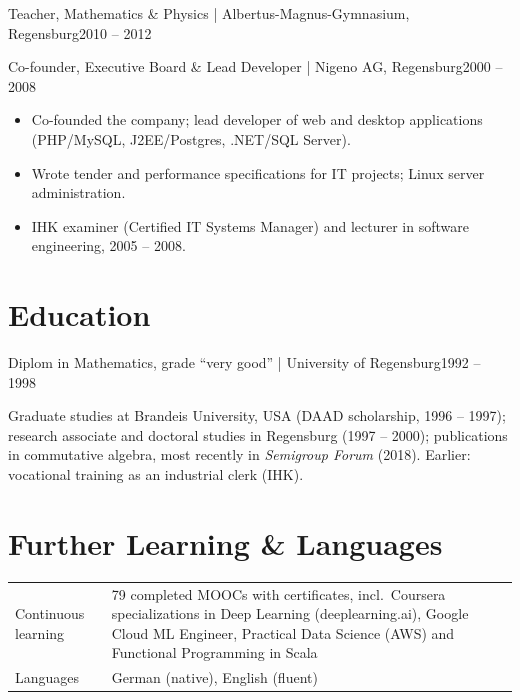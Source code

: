 \documentclass[10pt,a4paper]{article}
\newcommand*{\semibold}{\fontseries{sb}\selectfont}
\newcommand*{\job}[3]{%
  \par\addvspace{4pt}%
  {\semibold #1}\,{\color{muted}\,|\,\,#2}\hfill{\color{muted}\small #3}\par}
\newcommand*{\skill}[2]{{\semibold #1} & #2 \\[1.5pt]}
\begin{document}
\job{Teacher, Mathematics \& Physics}{Albertus-Magnus-Gymnasium, Regensburg}{2010 -- 2012}

\job{Co-founder, Executive Board \& Lead Developer}{Nigeno AG, Regensburg}{2000 -- 2008}
\begin{itemize}
  \item Co-founded the company; lead developer of web and desktop applications (PHP/MySQL, J2EE/Postgres, .NET/SQL Server).
  \item Wrote tender and performance specifications for IT projects; Linux server administration.
  \item IHK examiner (Certified IT Systems Manager) and lecturer in software engineering, 2005 -- 2008.
\end{itemize}

\section{Education}
\job{Diplom in Mathematics, grade ``very good''}{University of Regensburg}{1992 -- 1998}
Graduate studies at Brandeis University, USA (DAAD scholarship, 1996 -- 1997);
research associate and doctoral studies in Regensburg (1997 -- 2000); publications in commutative algebra, most recently in \emph{Semigroup Forum} (2018).
Earlier: vocational training as an industrial clerk (IHK).

\section{Further Learning \& Languages}
\begin{tabularx}{\linewidth}{@{}p{3.3cm}X@{}}
\skill{Continuous learning}{79 completed MOOCs with certificates, incl.\ Coursera specializations in Deep Learning (deeplearning.ai), Google Cloud ML Engineer, Practical Data Science (AWS) and Functional Programming in Scala}
\skill{Languages}{German (native), English (fluent)}
\end{tabularx}
\end{document}

